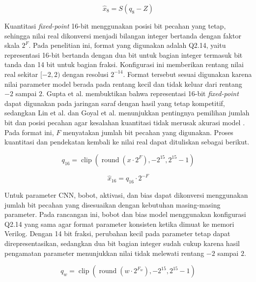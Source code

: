   \begin{equation}
      \hat{x}_8 = S(q_8 - Z)
      \label{eq:int8_dequantization}
  \end{equation}

  Kuantitasi \emph{fixed-point} 16-bit menggunakan posisi bit pecahan yang tetap,
  sehingga nilai real dikonversi menjadi bilangan integer bertanda dengan faktor
  skala $2^F$. Pada penelitian ini, format yang digunakan adalah Q2.14, yaitu
  representasi 16-bit bertanda dengan dua bit untuk bagian integer termasuk bit
  tanda dan 14 bit untuk bagian fraksi. Konfigurasi ini memberikan rentang nilai
  real sekitar $[-2, 2)$ dengan resolusi $2^{-14}$. Format tersebut sesuai
  digunakan karena nilai parameter model berada pada rentang kecil dan tidak
  keluar dari rentang $-2$ sampai $2$. Gupta et al. membuktikan bahwa representasi 16-bit
  \emph{fixed-point} dapat digunakan pada jaringan saraf dengan hasil yang tetap
  kompetitif, sedangkan Lin et al. dan Goyal et al. menunjukkan pentingnya
  pemilihan jumlah bit dan posisi pecahan agar kesalahan kuantitasi tidak merusak
  akurasi model \cite{Gupta2015LimitedPrecision,Lin2016FixedPointQuantization,Goyal2021FixedPointCNN}.
  Pada format ini, $F$ menyatakan jumlah bit pecahan yang digunakan. Proses
  kuantitasi dan pendekatan kembali ke nilai real dapat dituliskan sebagai berikut.

  \begin{equation}
      q_{16} =
      \operatorname{clip}
      \left(
      \operatorname{round}(x \cdot 2^F),
      -2^{15},
      2^{15}-1
      \right)
      \label{eq:fixed_point_quantization}
  \end{equation}

  \begin{equation}
      \hat{x}_{16} = q_{16} \cdot 2^{-F}
      \label{eq:fixed_point_dequantization}
  \end{equation}

  Untuk parameter CNN, bobot, aktivasi, dan bias dapat dikonversi menggunakan
  jumlah bit pecahan yang disesuaikan dengan kebutuhan masing-masing parameter.
  Pada rancangan ini, bobot dan bias model menggunakan konfigurasi Q2.14 yang
  sama agar format parameter konsisten ketika dimuat ke memori Verilog. Dengan
  14 bit fraksi, perubahan kecil pada parameter tetap dapat direpresentasikan,
  sedangkan dua bit bagian integer sudah cukup karena hasil pengamatan parameter
  menunjukkan nilai tidak melewati rentang $-2$ sampai $2$.

  \begin{equation}
      q_w =
      \operatorname{clip}
      \left(
      \operatorname{round}(w \cdot 2^{F_w}),
      -2^{15},
      2^{15}-1
      \right)
      \label{eq:fixed_weight_quantization}
  \end{equation}

